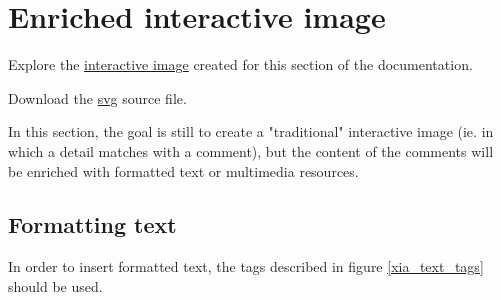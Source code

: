\section{Enriched interactive image}\label{enriched_IA}

\begin{links}
Explore the \href{http://xia.dane.ac-versailles.fr/demo/tuto/xia2}{interactive image} created for this section of the documentation.

Download the \href{http://xia.dane.ac-versailles.fr/demo/tuto/xia2/svg/xia2.svg}{svg} source file.
\end{links}

In this section, the goal is still to create a "traditional" interactive image 
(ie. in which a detail matches with a comment), but the content of the comments 
will be enriched with  formatted text or multimedia resources.


\newpage
\subsection{Formatting text}

In order to insert formatted text, the tags described in figure \ref{xia_text_tags} should be used.

